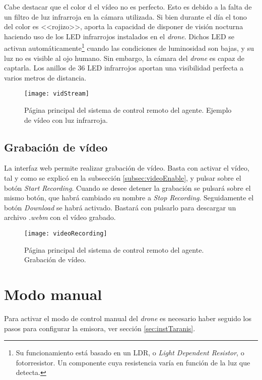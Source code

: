 Cabe destacar que el color d el vídeo no es perfecto. Esto es debido a la falta de un filtro de luz infrarroja en la cámara utilizada. Si bien durante el día el tono del color es <<rojizo>>, aporta la capacidad de disponer de visión nocturna haciendo uso de los LED infrarrojos instalados en el \emph{drone}. Dichos LED se activan automáticamente\footnote{Su funcionamiento está basado en un LDR, o \emph{Light Dependent Resistor}, o fotorresistor. Un componente cuya resistencia varía en función de la luz que detecta.} cuando las condiciones de luminosidad son bajas, y su luz no es visible al ojo humano. Sin embargo, la cámara del \emph{drone} es capaz de captarla. Los anillos de 36 LED infrarrojos aportan una visibilidad perfecta a varios metros de distancia. 

\begin{figure}[H]
	\centering
	\texttt{[image: vidStream]}
	\caption[Página principal. Gestión de vídeo. Nocturno.]{Página principal del sistema de control remoto del agente. Ejemplo de vídeo con luz infrarroja.}\label{fig:samplevidenight}
\end{figure}


\subsection{Grabación de vídeo}
La interfaz web permite realizar grabación de vídeo. Basta con activar el vídeo, tal y como se explicó en la subsección \ref{subsec:videoEnable}, y pulsar sobre el botón \emph{Start Recording}. Cuando se desee detener la grabación se pulsará sobre el mismo botón, que habrá cambiado su nombre a \emph{Stop Recording}. Seguidamente el botón \emph{Download} se habrá activado. Bastará con pulsarlo para descargar un archivo \emph{.webm} con el vídeo grabado.

\begin{figure}[H]
	\centering
	\texttt{[image: videoRecording]}
	\caption[Página principal. Gestión de vídeo. Grabación.]{Página principal del sistema de control remoto del agente. Grabación de vídeo.}\label{fig:userManualRecordVideo}
\end{figure}

\section{Modo manual}

Para activar el modo de control manual del \emph{drone} es necesario haber seguido los pasos para configurar la emisora, ver sección \ref{sec:instTaranis}. 

